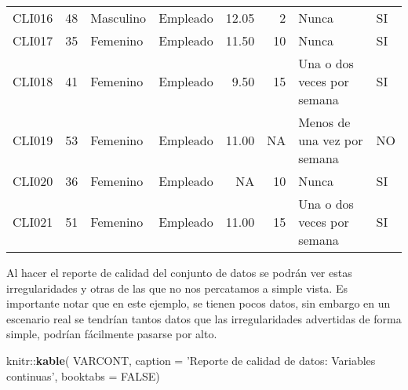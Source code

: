 \documentclass[]{book}
\newenvironment{Shaded}{\begin{snugshade}}{\end{snugshade}}
\newcommand{\KeywordTok}[1]{\textcolor[rgb]{0.13,0.29,0.53}{\textbf{{#1}}}}
\newcommand{\DataTypeTok}[1]{\textcolor[rgb]{0.13,0.29,0.53}{{#1}}}
\newcommand{\DecValTok}[1]{\textcolor[rgb]{0.00,0.00,0.81}{{#1}}}
\newcommand{\StringTok}[1]{\textcolor[rgb]{0.31,0.60,0.02}{{#1}}}
\newcommand{\OtherTok}[1]{\textcolor[rgb]{0.56,0.35,0.01}{{#1}}}
\newcommand{\NormalTok}[1]{{#1}}
\begin{document}
\begin{table}
\begin{tabular}[t]{lrllrrll}
CLI016 & 48 & Masculino & Empleado & 12.05 & 2 & Nunca & SI\\
\addlinespace
CLI017 & 35 & Femenino & Empleado & 11.50 & 10 & Nunca & SI\\
CLI018 & 41 & Femenino & Empleado & 9.50 & 15 & Una o dos veces por semana & SI\\
CLI019 & 53 & Femenino & Empleado & 11.00 & NA & Menos de una vez por semana & NO\\
CLI020 & 36 & Femenino & Empleado & NA & 10 & Nunca & SI\\
CLI021 & 51 & Femenino & Empleado & 11.00 & 15 & Una o dos veces por semana & SI\\
\bottomrule
\end{tabular}
\end{table}

Al hacer el reporte de calidad del conjunto de datos se podrán ver estas
irregularidades y otras de las que no nos percatamos a simple vista. Es
importante notar que en este ejemplo, se tienen pocos datos, sin embargo
en un escenario real se tendrían tantos datos que las irregularidades
advertidas de forma simple, podrían fácilmente pasarse por alto.

\begin{Shaded}
\end{Shaded}

\begin{Shaded}
\begin{Highlighting}[]
\NormalTok{knitr::}\KeywordTok{kable}\NormalTok{(}
  \NormalTok{VARCONT, }\DataTypeTok{caption =} \StringTok{'Reporte de calidad de datos: Variables continuas'}\NormalTok{,}
  \DataTypeTok{booktabs =} \OtherTok{FALSE}\NormalTok{)}
\end{Highlighting}
\end{Shaded}
\end{document}
